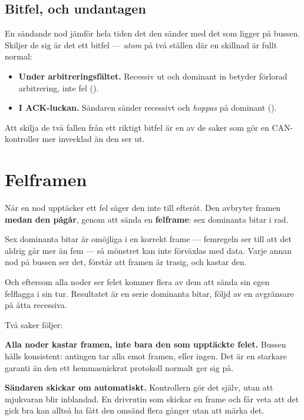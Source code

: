 \subsection{Bitfel, och undantagen}

En sändande nod jämför hela tiden det den sänder med det som ligger på bussen. Skiljer de sig är
det ett bitfel --- \emph{utom} på två ställen där en skillnad är fullt normal:

\begin{itemize}
  \item \textbf{Under arbitreringsfältet.} Recessiv ut och dominant in betyder förlorad
    arbitrering, inte fel ().
  \item \textbf{I ACK-luckan.} Sändaren sänder recessivt och \emph{hoppas} på dominant
    ().
\end{itemize}

Att skilja de två fallen från ett riktigt bitfel är en av de saker som gör en CAN-kontroller
mer invecklad än den ser ut.

\section{Felframen}

När en nod upptäcker ett fel säger den inte till efteråt. Den avbryter framen \textbf{medan den
pågår}, genom att sända en \textbf{felframe}: sex dominanta bitar i rad.

Sex dominanta bitar är omöjliga i en korrekt frame --- femregeln ser till att det aldrig går mer
än fem --- så mönstret kan inte förväxlas med data. Varje annan nod på bussen ser det, förstår att
framen är trasig, och kastar den.

Och eftersom alla noder ser felet kommer flera av dem att sända sin egen felflagga i sin tur.
Resultatet är en serie dominanta bitar, följd av en avgränsare på åtta recessiva.

Två saker följer:

\textbf{Alla noder kastar framen, inte bara den som upptäckte felet.} Bussen hålls konsistent:
antingen tar alla emot framen, eller ingen. Det är en starkare garanti än den ett
hemmasnickrat protokoll normalt ger sig på.

\textbf{Sändaren skickar om automatiskt.} Kontrollern gör det själv, utan att mjukvaran blir
inblandad. En drivrutin som skickar en frame och får veta att det gick bra kan alltså ha fått
den omsänd flera gånger utan att märka det.

